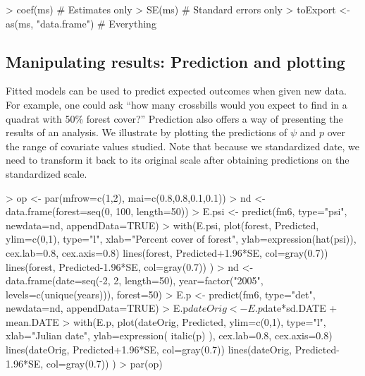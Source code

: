 \documentclass[12pt]{article}
\renewenvironment{Schunk}{\vspace{\topsep}}{\vspace{\topsep}}
\begin{document}
\begin{small}


\begin{Schunk}
\begin{Sinput}
> coef(ms)                            # Estimates only
> SE(ms)                              # Standard errors only
> toExport <- as(ms, "data.frame")    # Everything
\end{Sinput}
\end{Schunk}


\end{small}



\subsection{Manipulating results: Prediction and plotting}
Fitted models can be used to predict expected outcomes when given new
data. For example, one could ask ``how many crossbills would you
expect to find in a quadrat with 50\% forest cover?'' Prediction also
offers a way of
presenting the results of an analysis. We illustrate by plotting the
predictions of $\psi$ and $p$ over the range of covariate values studied.
Note that because we standardized date, we need to transform it back
to its original scale after obtaining predictions on the
standardized scale.


\begin{small}

\begin{Schunk}
\begin{Sinput}
> op <- par(mfrow=c(1,2), mai=c(0.8,0.8,0.1,0.1))
> nd <- data.frame(forest=seq(0, 100, length=50))
> E.psi <- predict(fm6, type="psi", newdata=nd, appendData=TRUE)
> with(E.psi, {
     plot(forest, Predicted, ylim=c(0,1), type="l",
          xlab="Percent cover of forest",
          ylab=expression(hat(psi)), cex.lab=0.8, cex.axis=0.8)
     lines(forest, Predicted+1.96*SE, col=gray(0.7))
     lines(forest, Predicted-1.96*SE, col=gray(0.7))
     })
> nd <- data.frame(date=seq(-2, 2, length=50),
                  year=factor("2005", levels=c(unique(years))),
                  forest=50)
> E.p <- predict(fm6, type="det", newdata=nd, appendData=TRUE)
> E.p$dateOrig <- E.p$date*sd.DATE + mean.DATE
> with(E.p, {
     plot(dateOrig, Predicted, ylim=c(0,1), type="l",
          xlab="Julian date", ylab=expression( italic(p) ),
          cex.lab=0.8, cex.axis=0.8)
     lines(dateOrig, Predicted+1.96*SE, col=gray(0.7))
     lines(dateOrig, Predicted-1.96*SE, col=gray(0.7))
     })
> par(op)
\end{Sinput}
\end{Schunk}

\end{small}
\end{document}
